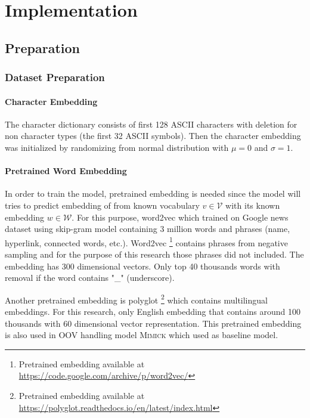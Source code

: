 \chapter{Implementation}
\label{chap:implementation}

\section{Preparation}
    \subsection{Dataset Preparation}
        \subsubsection{Character Embedding}
            The character dictionary consists of first 128 ASCII
            characters with deletion for non character types (the first 32
            ASCII symbols). Then the character embedding was initialized
            by randomizing from normal distribution with $\mu = 0$ and
            $\sigma = 1$.

        \subsubsection{Pretrained Word Embedding}
            In order to train the model, pretrained embedding is needed
            since the model will tries to predict embedding of from known
            vocabulary $v \in \mathcal{V}$ with its known embedding $w \in
            \mathcal{W}$. For this purpose, word2vec which trained on
            Google news dataset using skip-gram model containing 3 million
            words and phrases (name, hyperlink, connected words,
            etc.)\citep{Distributed2013mikolov}. Word2vec
            \footnote{Pretrained embedding available at 
            \url{https://code.google.com/archive/p/word2vec/}}
            contains phrases from negative sampling and for the purpose of
            this research those phrases did not included. The embedding
            has 300 dimensional vectors. Only top 40 thousands words with
            removal if the word contains "\_" (underscore).
            
            Another pretrained embedding is polyglot \footnote{Pretrained
            embedding available at
            \url{https://polyglot.readthedocs.io/en/latest/index.html}}
            \citep{polyglot2013alrfou} which contains multilingual
            embeddings. For this research, only English embedding that
            contains around 100 thousands with 60 dimensional vector
            representation. This pretrained embedding is also used in OOV
            handling model \textsc{Mimick} \citep{mimicking2017Pinter} which
            used as baseline model.

